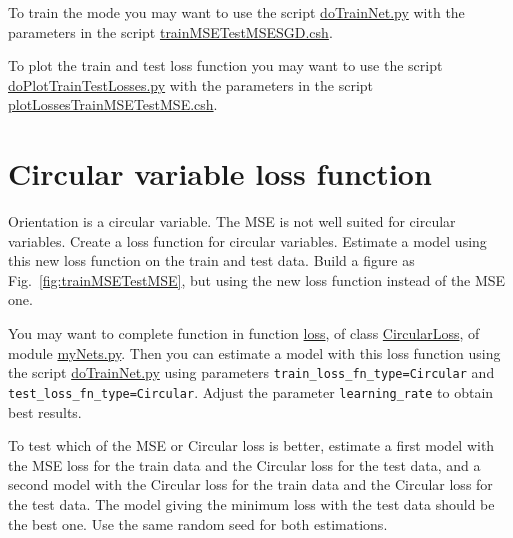 \documentclass[12pt]{article}
\begin{document}
To train the mode you may want to use the script
\href{https://github.com/joacorapela/statNeuro2025/blob/master/worksheets/08_artificialNeuralNetworks/code/scripts/doTrainNet.py}{doTrainNet.py}
with the parameters in the script
\href{https://github.com/joacorapela/statNeuro2025/blob/master/worksheets/08_artificialNeuralNetworks/code/scripts/trainMSETestMSESGD.csh}{trainMSETestMSESGD.csh}.

To plot the train and test loss function you may want to use the script
\href{https://github.com/joacorapela/statNeuro2025/blob/master/worksheets/08_artificialNeuralNetworks/code/scripts/doPlotTrainTestLosses.py}{doPlotTrainTestLosses.py}
with the parameters in the script
\href{https://github.com/joacorapela/statNeuro2025/blob/master/worksheets/08_artificialNeuralNetworks/code/scripts/plotLossesTrainMSETestMSE.csh}{plotLossesTrainMSETestMSE.csh}.

\section{Circular variable loss function}

Orientation is a circular variable. The MSE is not well suited for circular
variables. Create a loss function for circular variables. Estimate a model
using this new loss function on the train and test data. Build a figure as
Fig.~\ref{fig:trainMSETestMSE}, but using the new loss function instead of the
MSE one.

You may want to complete function in function
\href{https://github.com/joacorapela/statNeuro2025/blob/90b240fe0c8dc1f0bb0a48a0c5cc7e56754001a2/worksheets/08_artificialNeuralNetworks/code/scripts/myNets.py#L71}{loss},
of class
\href{https://github.com/joacorapela/statNeuro2025/blob/90b240fe0c8dc1f0bb0a48a0c5cc7e56754001a2/worksheets/08_artificialNeuralNetworks/code/scripts/myNets.py#L66}{CircularLoss},
of module
\href{https://github.com/joacorapela/statNeuro2025/blob/master/worksheets/08_artificialNeuralNetworks/code/scripts/myNets.py}{myNets.py}.
%
Then you can estimate a model with this loss function using the script
\href{https://github.com/joacorapela/statNeuro2025/blob/master/worksheets/08_artificialNeuralNetworks/code/scripts/doTrainNet.py}{doTrainNet.py}
using parameters \texttt{train\_loss\_fn\_type=Circular} and
\texttt{test\_loss\_fn\_type=Circular}. Adjust the parameter
\texttt{learning\_rate} to obtain best results.

To test which of the MSE or Circular loss is better, estimate a first model with
the MSE loss for the train data and the Circular loss for the test data,
and a second model with the Circular loss for the train data and the Circular
loss for the test data. The model giving the minimum loss with the test data
should be the best one. Use the same random seed for both estimations.
\end{document}
